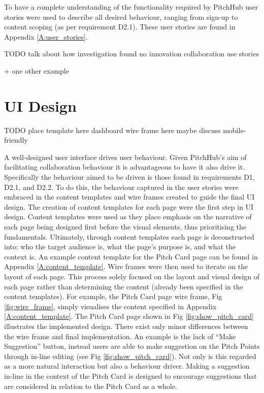 To have a complete understanding of the functionality required by PitchHub user stories were used to describe all desired behaviour, ranging from sign-up to content scoping (as per requirement D2.1). These user stories are found in Appendix \ref{A:user_stories}.

TODO
talk about how investigation found no innovation collaboration use stories

+ one other example

\section{UI Design}

TODO 
place template here
dashboard wire frame here 
maybe discuss mobile-friendly

A well-designed user interface drives user behaviour. Given PitchHub's aim of facilitating collaboration behaviour it is advantageous to have it also drive it. Specifically the behaviour aimed to be driven is those found in requirements D1, D2.1, and D2.2. To do this, the behaviour captured in the user stories were embraced in the content templates and wire frames created to guide the final UI design.
The creation of content templates for each page were the first step in UI design. Content templates were used as they place emphasis on the narrative of each page being designed first before the visual elements, thus prioritising the fundamentals. Ultimately, through content templates each page is deconstructed into: who the target audience is, what the page's purpose is, and what the context is. An example content template for the Pitch Card page can be found in Appendix \ref{A:content_template}.
Wire frames were then used to iterate on the layout of each page. This process solely focused on the layout and visual design of each page rather than determining the content (already been specified in the content templates). For example, the Pitch Card page wire frame, Fig \ref{fig:wire_frame}, simply visualises the content specified in Appendix \ref{A:content_template}. The Pitch Card page shown in Fig \ref{fig:show_pitch_card} illustrates the implemented design. There exist only minor differences between the wire frame and final implementation. An example is the lack of ``Make Suggestion'' button, instead users are able to make suggestion on the Pitch Points through in-line editing (see Fig \ref{fig:show_pitch_card}). Not only is this regarded as a more natural interaction but also a behaviour driver. Making a suggestion in-line in the context of the Pitch Card is designed to encourage suggestions that are considered in relation to the Pitch Card as a whole.

